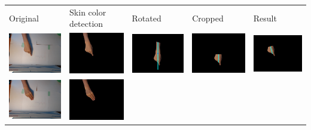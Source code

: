 \begin{tabular}{lllll}
 Original & Skin color detection & Rotated & Cropped & Result \\
\includegraphics[width=3.5cm]{fig4/1-a.png} &
\includegraphics[width=3.5cm]{fig4/1-b.png} &
\includegraphics[width=3.5cm]{fig4/1-c.png} &
\includegraphics[width=3.5cm]{fig4/1-d.png} &
\includegraphics[width=3.5cm]{fig4/1-e.png} \\
\includegraphics[width=3.5cm]{fig4/2-a.png} &
\includegraphics[width=3.5cm]{fig4/2-b.png} &

\end{tabular}
